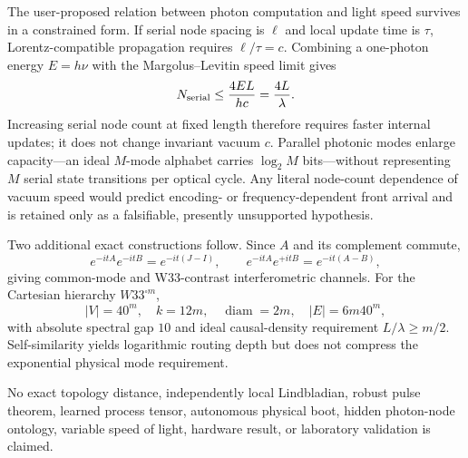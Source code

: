 The user-proposed relation between photon computation and light speed survives in a constrained form.  If serial node spacing is $\ell$ and local update time is $\tau$, Lorentz-compatible propagation requires $\ell/\tau=c$.  Combining a one-photon energy $E=h\nu$ with the Margolus--Levitin speed limit gives
\[
N_{\rm serial}\le \frac{4EL}{hc}=\frac{4L}{\lambda}.
\]
Increasing serial node count at fixed length therefore requires faster internal updates; it does not change invariant vacuum $c$.  Parallel photonic modes enlarge capacity---an ideal $M$-mode alphabet carries $\log_2 M$ bits---without representing $M$ serial state transitions per optical cycle.  Any literal node-count dependence of vacuum speed would predict encoding- or frequency-dependent front arrival and is retained only as a falsifiable, presently unsupported hypothesis.

Two additional exact constructions follow.  Since $A$ and its complement commute,
\[
e^{-itA}e^{-itB}=e^{-it(J-I)},\qquad
e^{-itA}e^{+itB}=e^{-it(A-B)},
\]
giving common-mode and W33-contrast interferometric channels.  For the Cartesian hierarchy $W33^{\square m}$,
\[
|V|=40^m,\quad k=12m,\quad \operatorname{diam}=2m,\quad |E|=6m40^m,
\]
with absolute spectral gap $10$ and ideal causal-density requirement $L/\lambda\ge m/2$.  Self-similarity yields logarithmic routing depth but does not compress the exponential physical mode requirement.

No exact topology distance, independently local Lindbladian, robust pulse theorem, learned process tensor, autonomous physical boot, hidden photon-node ontology, variable speed of light, hardware result, or laboratory validation is claimed.
